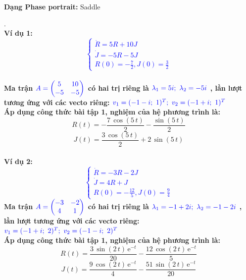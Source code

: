 \textbf{Dạng Phase portrait: } Saddle
\pagebreak
\begin{tcbdoublebox}[title={7. Eager Beaver and Hermit}]
\mdseries .\\
\bfseries Ví dụ 1: \\
\textcolor{blue}{$$\left\{\begin{matrix}
\dot{R} =  5R +10J \\ 
\dot{J} =  -5R-5J\\ 
R(0)= -\frac{7}{2}, J(0)=\frac{3}{2}
\end{matrix}\right.$$}\\
\mdseries Ma trận $\color{blue}A=\begin{pmatrix}
5 & 10\\ 
-5 & -5
\end{pmatrix}$ có hai trị riêng là 
$\color{blue}\lambda_{1}=5i;\ \lambda_{2}=-5i$
, lần lượt tương ứng với các vecto riêng:
$\color{blue}v_{1} = (-1-i;\ 1)^{T};\ v_{2}=(-1+i;\ 1)^{T}$\\Áp dụng công thức bài tập 1, nghiệm của hệ phương trình là:
$$R(t)=-\frac{7\,\cos\left(5\,t\right)}{2}-\frac{\sin\left(5\,t\right)}{2}$$
$$J(t)=\frac{3\,\cos\left(5\,t\right)}{2}+2\,\sin\left(5\,t\right)$$
\\
\bfseries Ví dụ 2:\\
\textcolor{blue}{$$\left\{\begin{matrix}
\dot{R} = -3R -2J \\ 
\dot{J} =  4R +J\\ 
R(0)= -\frac{12}{5}, J(0)=\frac{9}{4}
\end{matrix}\right.$$}
\mdseries Ma trận $\color{blue}A=\begin{pmatrix}
-3 & -2\\ 
4 & 1
\end{pmatrix}$ có hai trị riêng là 
$\color{blue}\lambda_{1}=-1+2i;\ \lambda_{2}=-1-2i$
, lần lượt tương ứng với các vecto riêng:
$\color{blue}v_{1} = (-1+i;\ 2)^{T};\ v_{2}=(-1-i;\ 2)^{T}$\\Áp dụng công thức bài tập 1, nghiệm của hệ phương trình là:
$$R(t)=\frac{3\,\sin\left(2\,t\right)\,{\mathrm{e}}^{-t}}{20}-\frac{12\,\cos\left(2\,t\right)\,{\mathrm{e}}^{-t}}{5}$$
$$J(t)=\frac{9\,\cos\left(2\,t\right)\,{\mathrm{e}}^{-t}}{4}-\frac{51\,\sin\left(2\,t\right)\,{\mathrm{e}}^{-t}}{20}$$

\end{tcbdoublebox}
\pagebreak
